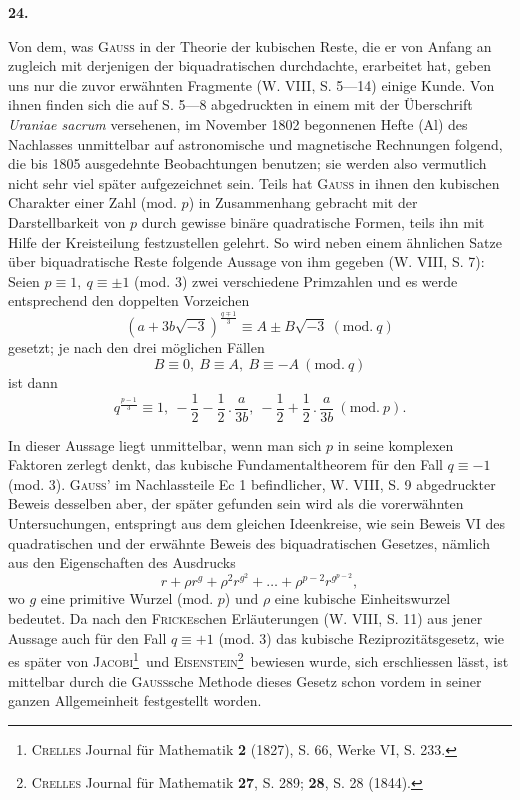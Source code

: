 \begin{center}\bfseries 24.\end{center}
\noindent\hspace*{\parindent}Von dem, was \textsc{Gauss} in der Theorie der kubischen Reste, die er von Anfang an zugleich mit derjenigen der biquadratischen durchdachte, erarbeitet hat, geben uns nur die zuvor erwähnten Fragmente (W. VIII, S. 5—14) einige Kunde. Von ihnen finden sich die auf S. 5—8 abgedruckten in einem mit der Überschrift \textit{Uraniae sacrum} versehenen, im November 1802 begonnenen Hefte (Al) des Nachlasses unmittelbar auf astronomische und magnetische Rechnungen folgend, die bis 1805 ausgedehnte Beobachtungen benutzen; sie werden also vermutlich nicht sehr viel später aufgezeichnet sein. Teils hat \textsc{Gauss} in ihnen den kubischen Charakter einer Zahl (mod. \(p\)) in Zusammenhang gebracht mit der Darstellbarkeit von \(p\) durch gewisse binäre quadratische Formen, teils ihn mit Hilfe der Kreisteilung festzustellen gelehrt. So wird neben einem ähnlichen Satze über biquadratische Reste folgende Aussage von ihm gegeben (W. VIII, S. 7): Seien \(p\equiv1,\ q\equiv\pm1\) (mod. 3) zwei verschiedene Primzahlen und es werde entsprechend den doppelten Vorzeichen
\[
(a+3b\sqrt{-3})^{\frac{q\mp1}{3}}\equiv A\pm B\sqrt{-3}\ (\mathrm{mod.}\ q)
\]
gesetzt; je nach den drei möglichen Fällen
\[
B\equiv0,\ B\equiv A,\ B\equiv-A\ (\mathrm{mod.}\ q)
\]
ist dann
\[
q^{\frac{p-1}{3}}\equiv1,\ -\frac12-\frac12\mathbin{.}\frac{a}{3b},\ -\frac12+\frac12\mathbin{.}\frac{a}{3b}\ (\mathrm{mod.}\ p).
\]

In dieser Aussage liegt unmittelbar, wenn man sich \(p\) in seine komplexen Faktoren zerlegt denkt, das kubische Fundamentaltheorem für den Fall
\newpage{}
\noindent \(q\equiv-1\) (mod. 3). \textsc{Gauss}’ im Nachlassteile Ec 1 befindlicher, W. VIII, S. 9 abgedruckter Beweis desselben aber, der später gefunden sein wird als die vorerwähnten Untersuchungen, entspringt aus dem gleichen Ideenkreise, wie sein Beweis VI des quadratischen und der erwähnte Beweis des biquadratischen Gesetzes, nämlich aus den Eigenschaften des Ausdrucks
\[
r+\rho r^g+\rho^2r^{g^2}+\ldots+\rho^{p-2}r^{g^{p-2}},
\]
wo \(g\) eine primitive Wurzel (mod. \(p\)) und \(\rho\) eine kubische Einheitswurzel bedeutet. Da nach den \textsc{Fricke}schen Erläuterungen (W. VIII, S. 11) aus jener Aussage auch für den Fall \(q\equiv+1\) (mod. 3) das kubische Reziprozitätsgesetz, wie es später von \textsc{Jacobi}\footnote{\textsc{Crelles} Journal für Mathematik \textbf{2} (1827), S. 66, Werke VI, S. 233.}\ und \textsc{Eisenstein}\begingroup\renewcommand{\thefootnote}{**)}\footnote{\textsc{Crelles} Journal für Mathematik \textbf{27}, S. 289; \textbf{28}, S. 28 (1844).}\endgroup\ bewiesen wurde, sich erschliessen lässt, ist mittelbar durch die \textsc{Gauss}sche Methode dieses Gesetz schon vordem in seiner ganzen Allgemeinheit festgestellt worden.

